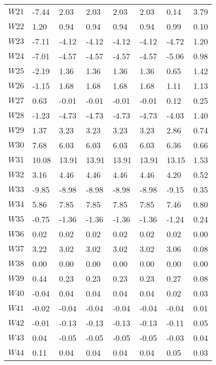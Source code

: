 \documentclass{article}
\begin{document}
\begin{longtable}{llllllll}
    $W21$ &   -7.44 & 2.03  & 2.03  & 2.03  & 2.03  & 0.14  & 3.79 \\
    $W22$ &   1.20  & 0.94  & 0.94  & 0.94  & 0.94  & 0.99  & 0.10 \\
    $W23$ &   -7.11 & -4.12 & -4.12 & -4.12 & -4.12 & -4.72 & 1.20 \\
    $W24$ &   -7.01 & -4.57 & -4.57 & -4.57 & -4.57 & -5.06 & 0.98 \\
    $W25$ &   -2.19 & 1.36  & 1.36  & 1.36  & 1.36  & 0.65  & 1.42 \\
    $W26$ &   -1.15 & 1.68  & 1.68  & 1.68  & 1.68  & 1.11  & 1.13 \\
    $W27$ &   0.63  & -0.01 & -0.01 & -0.01 & -0.01 & 0.12  & 0.25 \\
    $W28$ &   -1.23 & -4.73 & -4.73 & -4.73 & -4.73 & -4.03 & 1.40 \\
    $W29$ &   1.37  & 3.23  & 3.23  & 3.23  & 3.23  & 2.86  & 0.74 \\
    $W30$ &   7.68  & 6.03  & 6.03  & 6.03  & 6.03  & 6.36  & 0.66 \\
    $W31$ &   10.08 & 13.91 & 13.91 & 13.91 & 13.91 & 13.15 & 1.53 \\
    $W32$ &   3.16  & 4.46  & 4.46  & 4.46  & 4.46  & 4.20  & 0.52 \\
    $W33$ &   -9.85 & -8.98 & -8.98 & -8.98 & -8.98 & -9.15 & 0.35 \\
    $W34$ &   5.86  & 7.85  & 7.85  & 7.85  & 7.85  & 7.46  & 0.80 \\
    $W35$ &   -0.75 & -1.36 & -1.36 & -1.36 & -1.36 & -1.24 & 0.24 \\
    $W36$ &   0.02  & 0.02  & 0.02  & 0.02  & 0.02  & 0.02  & 0.00 \\
    $W37$ &   3.22  & 3.02  & 3.02  & 3.02  & 3.02  & 3.06  & 0.08 \\
    $W38$ &   0.00  & 0.00  & 0.00  & 0.00  & 0.00  & 0.00  & 0.00 \\
    $W39$ &   0.44  & 0.23  & 0.23  & 0.23  & 0.23  & 0.27  & 0.08 \\
    $W40$ &   -0.04 & 0.04  & 0.04  & 0.04  & 0.04  & 0.02  & 0.03 \\
    $W41$ &   -0.02 & -0.04 & -0.04 & -0.04 & -0.04 & -0.04 & 0.01 \\
    $W42$ &   -0.01 & -0.13 & -0.13 & -0.13 & -0.13 & -0.11 & 0.05 \\
    $W43$ &   0.04  & -0.05 & -0.05 & -0.05 & -0.05 & -0.03 & 0.04 \\
    $W44$ &   0.11  & 0.04  & 0.04  & 0.04  & 0.04  & 0.05  & 0.03 \\

\end{longtable}
\end{document}
